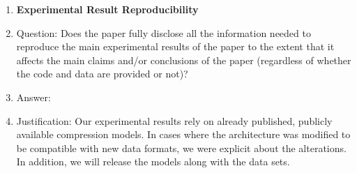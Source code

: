 \begin{enumerate}
    \item {\bf Experimental Result Reproducibility}
    \item[] Question: Does the paper fully disclose all the information needed to reproduce the main experimental results of the paper to the extent that it affects the main claims and/or conclusions of the paper (regardless of whether the code and data are provided or not)?
    \item[] Answer: \answerYes{} %
    \item[] Justification: Our experimental results rely on already published, publicly available compression models. In cases where the architecture was modified to be compatible with new data formats, we were explicit about the alterations. In addition, we will release the models along with the data sets. 

\end{enumerate}
